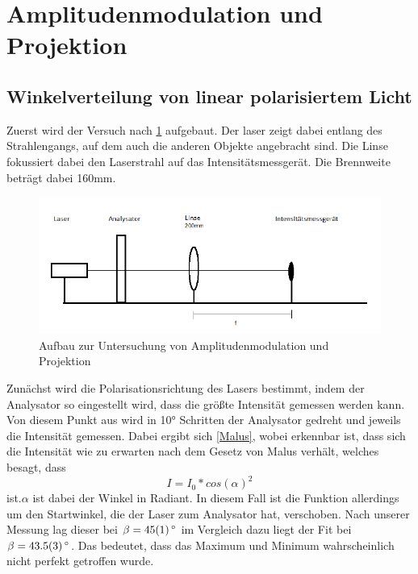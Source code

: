 \section{Amplitudenmodulation und Projektion}
\subsection{Winkelverteilung von linear polarisiertem Licht}
Zuerst wird der Versuch nach \cref{411} aufgebaut. Der laser zeigt dabei entlang des Strahlengangs, auf dem auch die anderen Objekte angebracht sind. Die Linse fokussiert dabei den Laserstrahl auf das Intensitätsmessgerät.
Die Brennweite beträgt dabei 160mm. 

\begin{figure}[h!]
	\centering
	\includegraphics[scale=0.6]{4.1.1-Aufbau.png}
	\caption{Aufbau zur Untersuchung von Amplitudenmodulation und Projektion}
	\label{411}
\end{figure}

Zunächst wird die Polarisationsrichtung des Lasers bestimmt, indem der Analysator so eingestellt wird, dass die größte Intensität gemessen werden kann. Von diesem Punkt aus wird in 10° Schritten der Analysator gedreht und jeweils die Intensität gemessen. Dabei ergibt sich \cref{Malus}, wobei erkennbar ist, dass  sich die Intensität wie zu erwarten nach dem Gesetz von Malus verhält, welches besagt, dass 
\begin{equation}
	I = I_{0}*cos(\alpha)^{2}
\end{equation}
ist.$\alpha$ ist dabei der Winkel in Radiant. In diesem Fall ist die Funktion allerdings um den Startwinkel, die der Laser zum Analysator hat, verschoben.
Nach unserer Messung lag dieser bei $\beta = \SI{45 \pm 1}{^\circ}$ im Vergleich dazu liegt der Fit bei $\beta = \SI{43,5 \pm 0,3}{^\circ}$. Das bedeutet, dass das Maximum und Minimum wahrscheinlich nicht perfekt getroffen wurde.


